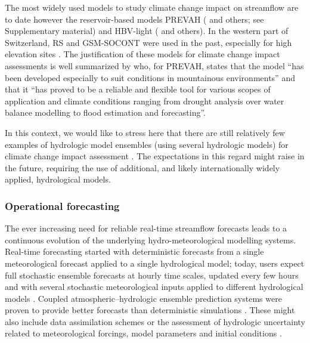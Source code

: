 \documentclass[10pt,a4paper]{article}
\begin{document}
The most widely used models to study climate change impact on streamflow are to date however the reservoir-based models PREVAH (\citealt{Koplin2012, Speich_2015, Milano2015a, Brunner2019c} and others;  see Supplementary material) and HBV-light (\citealt{Etter2017, Hakala2020, Brunner_2018, Jenicek2018}  and others). In the western part of Switzerland, RS and GSM-SOCONT were used in the past, especially for high elevation sites \citep{Horton2006, Uhlmann2013a, Uhlmann2013b, Terrier2015}. The justification of these models for climate change impact assessments is well summarized by \citet{Koplin2010} who, for PREVAH, states that the model ``has been developed especially to suit conditions in mountainous environments'' and that it ``has proved to be a reliable and flexible tool for various scopes of application and climate conditions ranging from drought analysis over water balance modelling to flood estimation and forecasting''. 

In this context, we would like to stress here that there are still relatively few examples of hydrologic model ensembles (using several hydrologic models) for climate change impact assessment \citep{Kobierska2011, Bosshard2013a, Addor2014}. The expectations in this regard might raise in the future, requiring the use of additional, and likely internationally widely applied, hydrological models.


\subsubsection{Operational forecasting}
\label{sec:application:forecasting}

The ever increasing need for reliable real-time streamflow forecasts leads to a continuous evolution of the underlying hydro-meteorological modelling systems. Real-time forecasting started with deterministic forecasts from a single meteorological forecast applied to a single hydrological model; today, users expect full stochastic ensemble forecasts at hourly time scales, updated every few hours and with several stochastic meteorological inputs applied to different hydrological models \citep{Jasper2016}. Coupled atmospheric--hydrologic ensemble prediction systems were proven to provide better forecasts than deterministic simulations \citep{Verbunt2007, Zappa2008, Jaun2008, Liechti2013}. These might also include data assimilation schemes \citep{Jorg-Hess2015a} or the assessment of hydrologic uncertainty related to meteorological forcings, model parameters and initial conditions \citep{Jaun2009, Zappa2011a, Fundel2011}.
\end{document}
